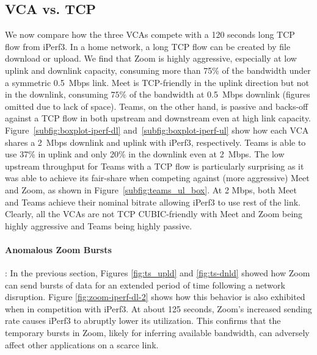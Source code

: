 \subsection{VCA vs. TCP}

We now compare how the three VCAs compete with a 120 seconds long TCP flow
from iPerf3. In a home network, a long TCP flow can be created by file
download or upload. We find that Zoom is highly aggressive,  especially at low
uplink and downlink capacity, consuming more than 75\% of the bandwidth under
a symmetric 0.5~Mbps link. Meet is TCP-friendly in the uplink direction but
not in the downlink, consuming $75\%$ of the bandwidth at 0.5~Mbps downlink
(figures omitted due to lack of space). Teams, on the other hand, is passive
and backs-off against a TCP flow in both upstream and downstream even at high
link capacity. Figure~\ref{subfig:boxplot-iperf-dl}
and~\ref{subfig:boxplot-iperf-ul} show how each VCA shares a 2~Mbps downlink
and uplink with iPerf3, respectively. Teams is able to use 37\% in uplink and
only 20\% in the downlink even at 2~Mbps. The low upstream throughput for
Teams with a TCP flow is particularly surprising as it was able to achieve its
fair-share when competing against (more aggressive) Meet and Zoom, as shown in Figure~\ref{subfig:teams_ul_box}. At 2 Mbps, both Meet and Teams achieve their nominal bitrate allowing iPerf3 to use rest of the link. Clearly, all the VCAs are not TCP CUBIC-friendly with Meet and Zoom being highly aggressive and Teams being highly passive. 


\paragraph{Anomalous Zoom Bursts}: In the previous section, Figures \ref{fig:ts_upld} and \ref{fig:ts-dnld} showed how Zoom can send bursts of data for an extended period of time following a network disruption. Figure \ref{fig:zoom-iperf-dl-2} shows how this behavior is also exhibited when in competition with iPerf3. At about 125 seconds, Zoom's increased sending rate causes iPerf3 to abruptly lower its utilization. This confirms that the temporary bursts in Zoom, likely for inferring available bandwidth, can adversely affect other applications on a scarce link. 


